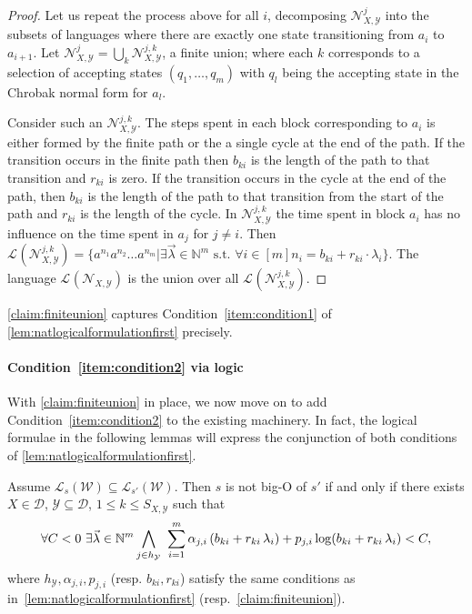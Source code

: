 \documentclass{lmcs}
\theoremstyle{plain}
\theoremstyle{definition}
\theoremstyle{remark}
\newcommand\lng[2]{\mathcal{L}_{#1}(#2)}
\newcommand\chr{a}
\newcommand\basevecraw{b}
\newcommand\pvecraw{r}
\newcommand\adm{\mathcal{D}}
\newcommand\wa{\mathcal{W}}
\begin{document}
\begin{proof}
Let us repeat the process above for all $i$, decomposing $\mathcal{N}_{X,\mathcal{Y}}^j$ into the subsets of languages where there are exactly one state transitioning from $\chr_{i}$ to $\chr_{i+1}$. Let $\mathcal{N}_{X,\mathcal{Y}}^j = \bigcup_k \mathcal{N}_{X,\mathcal{Y}}^{j,k}$, a finite union; where each $k$ corresponds to a selection of accepting states $(q_1,\dots,q_m)$ with $q_l$ being the accepting state in the Chrobak normal form for $\chr_l$.

Consider such an $\mathcal{N}_{X,\mathcal{Y}}^{j,k}$. The steps spent in each block corresponding to $\chr_i$ is either formed by the finite path or the a single cycle at the end of the path. If the transition occurs in the finite path then $\basevecraw_{ki}$ is the length of the path to that transition and $\pvecraw_{ki}$ is zero. If the transition occurs in the cycle at the end of the path, then $\basevecraw_{ki}$ is the length of the path to that transition from the start of the path and $\pvecraw_{ki}$ is the length of the cycle. In $\mathcal{N}_{X,\mathcal{Y}}^{j,k}$ the time spent in block $\chr_i$ has no influence on the time spent in $\chr_j$ for $j\ne i$. Then $\lng{}{\mathcal{N}_{X,\mathcal{Y}}^{j,k}} = \{\chr^{n_1}\chr^{n_2}\dots \chr^{n_m} |  \exists \vec{\lambda}\in\mathbb{N}^m \text{ s.t. }\forall i\in[m] n_i = \basevecraw_{ki} + \pvecraw_{ki}\cdot \lambda_i \}$. The language $\lng{}{\mathcal{N}_{X,\mathcal{Y}}}$ is the union over all $\lng{}{\mathcal{N}_{X,\mathcal{Y}}^{j,k}}$.
\end{proof}

\cref{claim:finiteunion} captures Condition~\ref{item:condition1} of \cref{lem:natlogicalformulationfirst} precisely.
\paragraph*{Condition~\ref{item:condition2} via logic}
With \cref{claim:finiteunion} in place, we now move on to add   Condition~\ref{item:condition2} to the existing machinery. In fact, the logical formulae in the following lemmas will express the conjunction of   both conditions of \cref{lem:natlogicalformulationfirst}.

\begin{lem}\label{lem:natlogicalformulation}
Assume  $\lng{s}{\wa}\subseteq \lng{s'}{\wa}$. Then
$s$ is not big-O of $s'$ if and only if there exists  $X\in\adm$, $\mathcal{Y}\subseteq\adm$, $1\le k\le S_{X,\mathcal{Y}}$ such that
\
\[
\forall C < 0\  \exists \vec{\lambda} \in \mathbb{N}^m \\
\bigwedge_{j\in h_\mathcal{Y}}\ \sum_{i=1}^m \alpha_{j,i} \,(\basevecraw_{ki} + \pvecraw_{ki} \, \lambda_i) +  p_{j,i}\log(\basevecraw_{ki} + \pvecraw_{ki} \,\lambda_i) < C,
\]
where $h_\mathcal{Y}, \alpha_{j,i}, p_{j,i}$ (resp.  $\basevecraw_{ki},  \pvecraw_{ki}$) satisfy the same conditions as in~\cref{lem:natlogicalformulationfirst} (resp.~\ref{claim:finiteunion}).
\end{lem}
\end{document}

